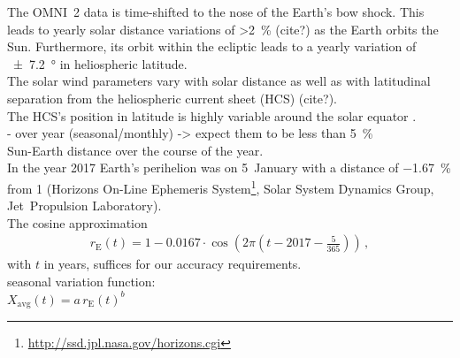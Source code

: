 The OMNI~2 data is time-shifted to the nose of the Earth's bow shock. This leads to yearly solar distance variations of \SI{>2}{\percent} (cite?) as the Earth orbits the Sun. Furthermore, its orbit within the ecliptic leads to a yearly variation of \SI{+-7.2}{\degree} in heliospheric latitude.\\
The solar wind parameters vary with solar distance as well as with latitudinal separation from the heliospheric current sheet (HCS) (cite?).\\
The HCS's position in latitude is highly variable around the solar equator \citep[p.~127~ff.?]{Schwenn1990}.\\

- over year (seasonal/monthly) -> expect them to be less than 5~\%\\

Sun-Earth distance over the course of the year.\\
In the year 2017 Earth's perihelion was on 5~January with a distance of \SI{-1.67}{\percent} from \SI{1}{\au} (Horizons On-Line Ephemeris System\footnote{\url{http://ssd.jpl.nasa.gov/horizons.cgi}}, Solar System Dynamics Group, Jet~Propulsion Laboratory).\\
The cosine approximation
\begin{align}
	r_\text{E}(t) = 1 - 0.0167 \cdot \cos\left(2 \pi \left(t - 2017 - \frac{5}{365}\right)\right)\,,
\end{align}
with $t$ in years, suffices for our accuracy requirements.\\

seasonal variation function:\\
$X_\text{avg}(t) = a\,r_\text{E}(t)^b$\\

